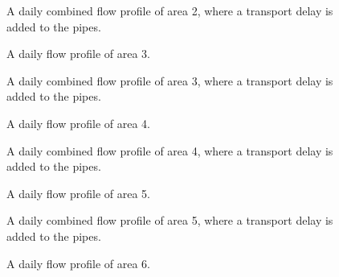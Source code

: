 \begin{figure}[H]
\centering

\caption{A daily combined flow profile of area 2, where a transport delay is added to the pipes.}
\label{fig:flow_profile_zone_2_combined_with_delay}
\end{figure} 

\begin{figure}[H]
\centering

\caption{A daily flow profile of area 3.}
\label{fig:APP_flow_profile_zone3}
\end{figure} 

\begin{figure}[H]
\centering

\caption{A daily combined flow profile of area 3, where a transport delay is added to the pipes.}
\label{fig:flow_profile_zone_3_combined_with_delay}
\end{figure} 

\begin{figure}[H]
\centering

\caption{A daily flow profile of area 4.}
\label{fig:APP_flow_profile_zone4}
\end{figure} 

\begin{figure}[H]
\centering

\caption{A daily combined flow profile of area 4, where a transport delay is added to the pipes.}
\label{fig:flow_profile_zone_4_combined_with_delay}
\end{figure} 

\begin{figure}[H]
\centering

\caption{A daily flow profile of area 5.}
\label{fig:APP_flow_profile_zone5}
\end{figure} 

\begin{figure}[H]
\centering

\caption{A daily combined flow profile of area 5, where a transport delay is added to the pipes.}
\label{fig:flow_profile_zone_5_combined_with_delay}
\end{figure} 

\begin{figure}[H]
\centering

\caption{A daily flow profile of area 6.}
\label{fig:APP_flow_profile_zone6}
\end{figure} 


